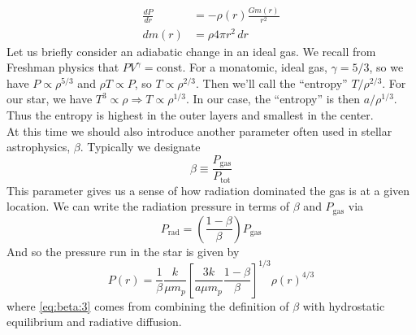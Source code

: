\documentclass[10pt]{article}
\numberwithin{equation}{section}
\newcommand{\n}{\noindent}
\begin{document}
	\begin{align}
		\label{HTS.40} \frac{dP}{dr}&=-\rho(r)\frac{Gm(r)}{r^2}\\
		\label{HTS.41} dm(r) &= \rho 4\pi r^2\,dr
	\end{align}
	Let us briefly consider an adiabatic change in an ideal gas. We recall 
from Freshman physics that $PV^\gamma=\mathrm{const}$. For a monatomic, 
ideal gas, $\gamma=5/3$, so we have $P\propto \rho^{5/3}$ and $\rho T
\propto P$, so $T\propto \rho^{2/3}$. Then we'll call the ``entropy'' $T/
\rho^{2/3}$. For our star, we have $T^3\propto \rho\Rightarrow T\propto 
\rho^{1/3}$. In our case, the ``entropy'' is then $a/\rho^{1/3}$. Thus the 
entropy is highest in the outer layers and smallest in the center.\\

\n At this time we should also introduce another parameter often used in
stellar astrophysics, $\beta$. Typically we designate
\begin{equation}
	\label{eq:beta:1} \beta \equiv \frac{P_\mathrm{gas}}{P_{\mathrm{tot}}}
\end{equation}
This parameter gives us a sense of how radiation dominated the gas is at a
given location. We can write the radiation pressure in terms of $\beta$ and
$P_{\mathrm{gas}}$ via
\begin{equation}
	\label{eq:beta:2} P_{\mathrm{rad}} = \left(\frac{1-\beta}{\beta}\right)
P_{\mathrm{gas}}
\end{equation}
And so the pressure run in the star is given by
\begin{equation}
	\label{eq:beta:3} P(r) = \frac{1}{\beta}\frac{k}{\mu
m_p}\left[\frac{3k}{a\mu m_p}\frac{1-\beta}{\beta}\right]^{1/3}
\rho(r)^{4/3}
\end{equation}
where \eqref{eq:beta:3} comes from combining the definition of $\beta$ with hydrostatic equilibrium and radiative diffusion.
\end{document}
